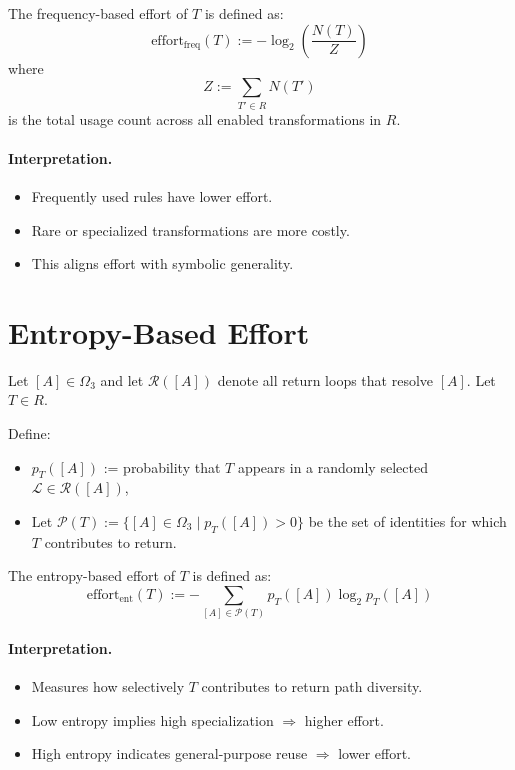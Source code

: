 \begin{definition}
The frequency-based effort of $T$ is defined as:
\begin{equation} \label{eq:effort-frequency}
\text{effort}_{\text{freq}}(T) := -\log_2\left( \frac{N(T)}{Z} \right)
\end{equation}
where
\[
Z := \sum_{T' \in R} N(T')
\]
is the total usage count across all enabled transformations in $R$.
\end{definition}

\paragraph{Interpretation.}
\begin{itemize}
    \item Frequently used rules have lower effort.
    \item Rare or specialized transformations are more costly.
    \item This aligns effort with symbolic generality.
\end{itemize}

\section{Entropy-Based Effort} \label{entropy-based-effort}

Let $[A] \in \Omega_3$ and let $\mathcal{R}([A])$ denote all return loops that resolve $[A]$. Let $T \in R$.

Define:
\begin{itemize}
    \item $p_T([A])$ := probability that $T$ appears in a randomly selected $\mathcal{L} \in \mathcal{R}([A])$,
    \item Let $\mathcal{P}(T) := \{ [A] \in \Omega_3 \mid p_T([A]) > 0 \}$ be the set of identities for which $T$ contributes to return.
\end{itemize}

\begin{definition}
The entropy-based effort of $T$ is defined as:
\begin{equation} \label{eq:effort-entropy}
\text{effort}_{\text{ent}}(T) := -\sum_{[A] \in \mathcal{P}(T)} p_T([A]) \log_2 p_T([A])
\end{equation}
\end{definition}

\paragraph{Interpretation.}
\begin{itemize}
    \item Measures how selectively $T$ contributes to return path diversity.
    \item Low entropy implies high specialization $\Rightarrow$ higher effort.
    \item High entropy indicates general-purpose reuse $\Rightarrow$ lower effort.
\end{itemize}

